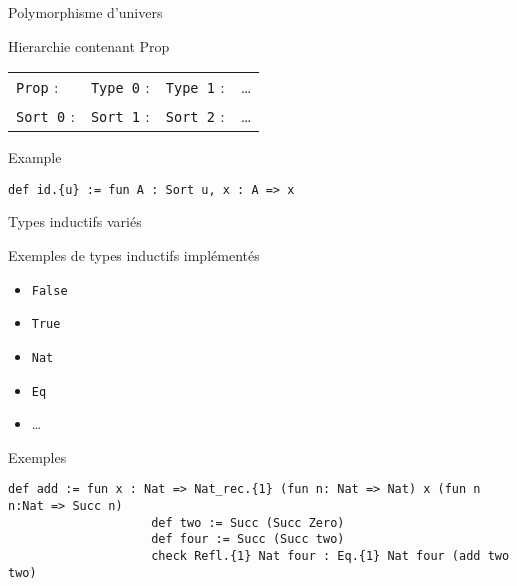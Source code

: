\documentclass[12pt, aspectratio=169]{beamer}
\begin{document}
        \begin{frame}[fragile]{Polymorphisme d'univers}
            
            \begin{block}{Hierarchie contenant Prop}
               
                \begin{tabular}{llll}
                    \texttt{Prop} :& \texttt{Type 0} :& \texttt{Type 1} :& \dots \\
                    \texttt{Sort 0} :& \texttt{Sort 1} :& \texttt{Sort 2} :& \dots
                \end{tabular}
                
            \end{block}

            \begin{exampleblock}{Example}
                
                \begin{lstlisting}[language=mdln]
                    def id.{u} := fun A : Sort u, x : A => x
                \end{lstlisting}

            \end{exampleblock}

        \end{frame}

        \begin{frame}[fragile]{Types inductifs variés}
            
            \begin{exampleblock}{Exemples de types inductifs implémentés}
                
                \begin{itemize}
                    \item \lstinline{False} 
                    \item \lstinline{True}
                    \item \lstinline{Nat}
                    \item \lstinline{Eq}
                    \item \dots
                \end{itemize}

            \end{exampleblock} \pause

            \begin{exampleblock}{Exemples}
                
                \begin{lstlisting}[language=mdln]
                    def add := fun x : Nat => Nat_rec.{1} (fun n: Nat => Nat) x (fun n n:Nat => Succ n)
                    def two := Succ (Succ Zero)
                    def four := Succ (Succ two)
                    check Refl.{1} Nat four : Eq.{1} Nat four (add two two)
                \end{lstlisting}

            \end{exampleblock}

        \end{frame}
\end{document}
